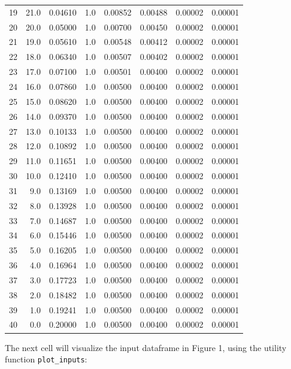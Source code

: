 \documentclass[draft]{agujournal2019}
\begin{document}
\begin{table}[H]
\begin{tabular}{r | r | r | r | r | r | r | r}
19 & 21.0 & 0.04610 & 1.0 & 0.00852 & 0.00488 & 0.00002 & 0.00001 \\
20 & 20.0 & 0.05000 & 1.0 & 0.00700 & 0.00450 & 0.00002 & 0.00001 \\
21 & 19.0 & 0.05610 & 1.0 & 0.00548 & 0.00412 & 0.00002 & 0.00001 \\
22 & 18.0 & 0.06340 & 1.0 & 0.00507 & 0.00402 & 0.00002 & 0.00001 \\
23 & 17.0 & 0.07100 & 1.0 & 0.00501 & 0.00400 & 0.00002 & 0.00001 \\
24 & 16.0 & 0.07860 & 1.0 & 0.00500 & 0.00400 & 0.00002 & 0.00001 \\
25 & 15.0 & 0.08620 & 1.0 & 0.00500 & 0.00400 & 0.00002 & 0.00001 \\
26 & 14.0 & 0.09370 & 1.0 & 0.00500 & 0.00400 & 0.00002 & 0.00001 \\
27 & 13.0 & 0.10133 & 1.0 & 0.00500 & 0.00400 & 0.00002 & 0.00001 \\
28 & 12.0 & 0.10892 & 1.0 & 0.00500 & 0.00400 & 0.00002 & 0.00001 \\
29 & 11.0 & 0.11651 & 1.0 & 0.00500 & 0.00400 & 0.00002 & 0.00001 \\
30 & 10.0 & 0.12410 & 1.0 & 0.00500 & 0.00400 & 0.00002 & 0.00001 \\
31 &  9.0 & 0.13169 & 1.0 & 0.00500 & 0.00400 & 0.00002 & 0.00001 \\
32 &  8.0 & 0.13928 & 1.0 & 0.00500 & 0.00400 & 0.00002 & 0.00001 \\
33 &  7.0 & 0.14687 & 1.0 & 0.00500 & 0.00400 & 0.00002 & 0.00001 \\
34 &  6.0 & 0.15446 & 1.0 & 0.00500 & 0.00400 & 0.00002 & 0.00001 \\
35 &  5.0 & 0.16205 & 1.0 & 0.00500 & 0.00400 & 0.00002 & 0.00001 \\
36 &  4.0 & 0.16964 & 1.0 & 0.00500 & 0.00400 & 0.00002 & 0.00001 \\
37 &  3.0 & 0.17723 & 1.0 & 0.00500 & 0.00400 & 0.00002 & 0.00001 \\
38 &  2.0 & 0.18482 & 1.0 & 0.00500 & 0.00400 & 0.00002 & 0.00001 \\
39 &  1.0 & 0.19241 & 1.0 & 0.00500 & 0.00400 & 0.00002 & 0.00001 \\
40 &  0.0 & 0.20000 & 1.0 & 0.00500 & 0.00400 & 0.00002 & 0.00001 \\
\hline
\end{tabular}
\end{table}


The next cell will visualize the input dataframe in Figure 1, using the
utility function \colorbox{gray!20}{\texttt{plot\_inputs}}:
\end{document}
